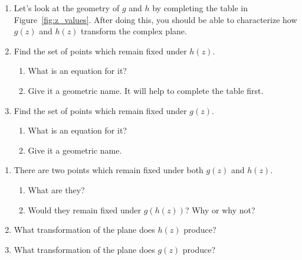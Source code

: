 \documentclass[../gatm_answers.tex]{subfiles}
\begin{document}
\begin{enumerate}
\setcounter{enumi}{\value{problem_i}}
\item Let's look at the geometry of $g$ and $h$ by completing the table in Figure~\ref{fig:z_values}. After doing this, you should be able to characterize how $g(z)$ and $h(z)$ transform the complex plane.
\item Find the set of points which remain fixed under $h(z)$.
\begin{enumerate}
\item What is an equation for it?
\item Give it a geometric name. It will help to complete the table first.
\end{enumerate}
\item Find the set of points which remain fixed under $g(z)$.
\begin{enumerate}
\item What is an equation for it?
\item Give it a geometric name.
\end{enumerate}
\setcounter{problem_i}{\value{enumi}}
\end{enumerate}

\begin{enumerate}
\setcounter{enumi}{\value{problem_i}}
\item There are two points which remain fixed under both $g(z)$ and $h(z)$.
\begin{enumerate}
\item What are they?
\item Would they remain fixed under $g(h(z))$? Why or why not?
\end{enumerate}
\item What transformation of the plane does $h(z)$ produce?
\item What transformation of the plane does $g(z)$ produce?
\setcounter{problem_i}{\value{enumi}}
\end{enumerate}
\end{document}
